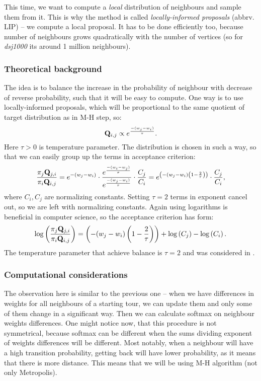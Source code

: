 	This time, we want to compute a \textit{local} distribution of neighbours and sample them from it. This is why the method is called \textit{locally-informed proposals} (abbrv. LIP) -- we compute a local proposal. It has to be done efficiently too, because number of neighbours grows quadratically with the number of vertices (so for \textit{dsj1000} its around 1 million neighbours).
	
	\subsubsection{Theoretical background}
		The idea is to balance the increase in the probability of neighbour with decrease of reverse probability, such that it will be easy to compute. One way is to use locally-informed proposals, which will be proportional to the same quotient of target distribution as in M-H step, so:
		\begin{equation*}
			\mathbf{Q}_{i,j} \propto e^\frac{-(w_{j} - w_i)}{\tau}.
		\end{equation*}
		Here $\tau>0$ is temperature parameter. The distribution is chosen in such a way, so that we can easily group up the terms in acceptance criterion:
		\begin{equation*}
			\frac{\pi_j \mathbf{Q}_{j,i}}{\pi_i \mathbf{Q}_{i,j}} = e^{-(w_j-w_i)} \cdot \frac{e^\frac{-(w_{i} - w_j)}{\tau}}{e^\frac{-(w_{j} - w_i)}{\tau}} \cdot \frac{C_j}{C_i} = e^{\left( -(w_j-w_i) \left(1 - \frac{2}{\tau}\right) \right)} \cdot \frac{C_j}{C_i},
		\end{equation*}
		where $C_i, C_j$ are normalizing constants. Setting $\tau=2$ terms in exponent cancel out, so we are left with normalizing constants. Again using logarithms is beneficial in computer science, so the acceptance criterion has form:
		\begin{equation*}
			\log\left(\frac{\pi_j \mathbf{Q}_{j,i}}{\pi_i \mathbf{Q}_{i,j}}\right) = \left( -(w_j-w_i) \left(1 - \frac{2}{\tau}\right) \right) + \log\left(C_j\right) - \log\left(C_i\right).
		\end{equation*}
		The temperature parameter that achieve balance is $\tau=2$ and was considered in \cite{zanella2020informed}.
	
	\subsubsection{Computational considerations}
		The observation here is similar to the previous one -- when we have differences in weights for all neighbours of a starting tour, we can update them and only some of them change in a significant way. Then we can calculate softmax on neighbour weights differences. One might notice now, that this procedure is not symmetrical, because softmax can be different when the sums dividing exponent of weights differences will be different. Most notably, when a neighbour will have a high transition probability, getting back will have lower probability, as it means that there is more distance. This means that we will be using M-H algorithm (not only Metropolis).
		
